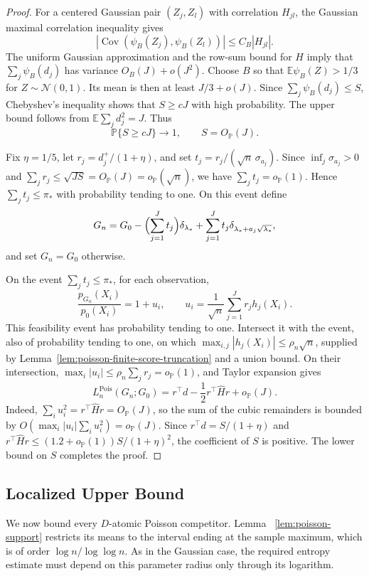\documentclass[11pt]{article}
\theoremstyle{definition}
\numberwithin{equation}{section}
\newcommand{\E}{\mathbb{E}}
\newcommand{\wh}{\widehat}
\DeclareMathOperator{\Cov}{Cov}
\begin{document}
\begin{proof}
For a centered Gaussian pair
\((Z_j,Z_l)\) with correlation \(H_{jl}\), the Gaussian maximal
correlation inequality gives
\[
    |\Cov(\psi_B(Z_j),\psi_B(Z_l))|
    \le C_B|H_{jl}|.
\]
The uniform Gaussian approximation and the row-sum bound for \(H\) imply
that \(\sum_j\psi_B(d_j)\) has variance
\(O_B(J)+o(J^2)\). Choose \(B\) so that
\(\E\psi_B(Z)>1/3\) for \(Z\sim\mathcal N(0,1)\). Its mean is then at
least \(J/3+o(J)\). Since \(\sum_j\psi_B(d_j)\le S\), Chebyshev's
inequality shows that \(S\ge cJ\) with high probability. The upper bound
follows from \(\E\sum_jd_j^2=J\). Thus
\[
    \mathbb P\{S\ge cJ\}\to1,
    \qquad
    S=O_{\mathbb P}(J).
\]

Fix \(\eta=1/5\), let \(r_j=d_j^+/(1+\eta)\), and set
\(t_j=r_j/(\sqrt n\,\sigma_{a_j})\). Since
\(\inf_j\sigma_{a_j}>0\) and
\(\sum_jr_j\le\sqrt{JS}=O_{\mathbb P}(J)=o_{\mathbb P}(\sqrt n)\),
we have \(\sum_jt_j=o_{\mathbb P}(1)\). Hence
\(\sum_jt_j\le\pi_*\) with probability tending to one. On this event define
\[
    G_n=
    G_0-
    \Bigl(\sum_{j=1}^Jt_j\Bigr)\delta_{\lambda_*}
    +
    \sum_{j=1}^Jt_j\delta_{\lambda_*+a_j\sqrt{\lambda_*}},
\]
and set \(G_n=G_0\) otherwise.

On the event \(\sum_jt_j\le\pi_*\), for each observation,
\[
    \frac{p_{G_n}(X_i)}{p_0(X_i)}
    =
    1+u_i,
    \qquad
    u_i=\frac1{\sqrt n}\sum_{j=1}^Jr_jh_j(X_i).
\]
This feasibility event has probability tending to one. Intersect it with the
event, also of probability tending to one, on which
\(\max_{i,j}|h_j(X_i)|\le\rho_n\sqrt n\), supplied by
Lemma~\ref{lem:poisson-finite-score-truncation} and a union bound. On their
intersection, \(\max_i|u_i|\le\rho_n\sum_jr_j=o_{\mathbb P}(1)\), and Taylor
expansion gives
\[
    L_n^{\mathrm{Pois}}(G_n;G_0)
    =
    r^\top d-\frac12 r^\top\wh H r+o_{\mathbb P}(J).
\]
Indeed, \(\sum_i u_i^2=r^\top\wh H r=O_{\mathbb P}(J)\), so the sum of
the cubic remainders is bounded by
\(O(\max_i|u_i|\sum_i u_i^2)=o_{\mathbb P}(J)\).
Since \(r^\top d=S/(1+\eta)\) and
\(r^\top\wh H r\le(1.2+o_{\mathbb P}(1))S/(1+\eta)^2\), the coefficient
of \(S\) is positive. The lower bound on \(S\) completes the proof.
\end{proof}

\subsection{Localized Upper Bound}
\label{sec:poisson-localized-upper}

We now bound every \(D\)-atomic Poisson competitor. Lemma
~\ref{lem:poisson-support} restricts its means to the interval ending at the
sample maximum, which is of order \(\log n/\log\log n\). As in the Gaussian
case, the required entropy estimate must depend on this parameter radius only
through its logarithm.
\end{document}
